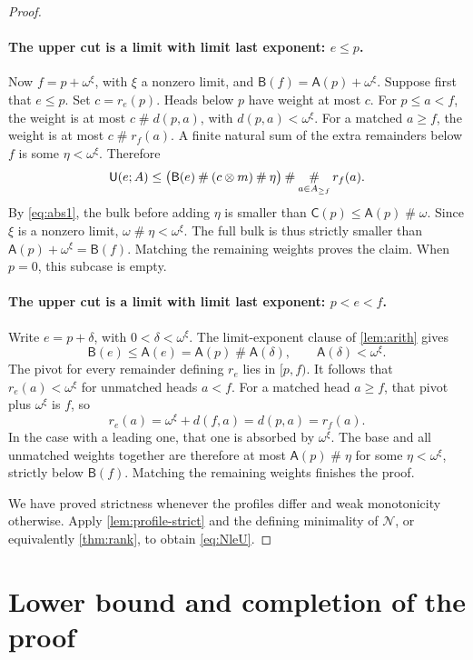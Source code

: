 \documentclass[11pt,a4paper]{article}
\theoremstyle{definition}
\newcommand{\ns}{\mathbin{\#}}
\newcommand{\nprod}{\mathbin{\otimes}}
\newcommand{\bigns}{\mathop{\#}\displaylimits}
\newcommand{\OpN}{\mathcal N}
\newcommand{\FunA}{\mathsf A}
\newcommand{\FunB}{\mathsf B}
\newcommand{\FunC}{\mathsf C}
\newcommand{\FunU}{\mathsf U}
\newcommand{\dd}[2]{d(#1,#2)}
\begin{document}
\begin{proof}
\paragraph{The upper cut is a limit with limit last exponent: $e\le p$.}
Now $f=p+\omega^\xi$, with $\xi$ a nonzero limit, and
$\FunB(f)=\FunA(p)+\omega^\xi$. Suppose first that $e\le p$.
Set $c=r_e(p)$. Heads below $p$ have weight at most $c$.
For $p\le a<f$, the weight is at most $c\ns\dd{p}{a}$, with
$\dd{p}{a}<\omega^\xi$. For a matched $a\ge f$, the weight is at most
$c\ns r_f(a)$. A finite natural sum of the extra remainders below $f$ is
some $\eta<\omega^\xi$. Therefore
\[
 \FunU(e;A)\le
 \bigl(\FunB(e)\ns(c\nprod m)\ns\eta\bigr)
      \ns\bigns_{a\in A_{\ge f}}r_f(a).
\]
By \eqref{eq:abs1}, the bulk before adding $\eta$ is smaller than
$\FunC(p)\le\FunA(p)\ns\omega$. Since $\xi$ is a nonzero limit,
$\omega\ns\eta<\omega^\xi$. The full bulk is thus strictly smaller than
$\FunA(p)+\omega^\xi=\FunB(f)$. Matching the remaining weights proves the
claim. When $p=0$, this subcase is empty.

\paragraph{The upper cut is a limit with limit last exponent: $p<e<f$.}
Write $e=p+\delta$, with $0<\delta<\omega^\xi$. The limit-exponent clause
of \cref{lem:arith} gives
\[
 \FunB(e)\le\FunA(e)=\FunA(p)\ns\FunA(\delta),
 \qquad\FunA(\delta)<\omega^\xi.
\]
The pivot for every remainder defining $r_e$ lies in $[p,f)$.
It follows that $r_e(a)<\omega^\xi$ for unmatched heads $a<f$.
For a matched head $a\ge f$, that pivot plus $\omega^\xi$ is $f$, so
\[
 r_e(a)=\omega^\xi+\dd{f}{a}=\dd{p}{a}=r_f(a).
\]
In the case with a leading one, that one is absorbed by $\omega^\xi$.
The base and all unmatched weights together are therefore at most
$\FunA(p)\ns\eta$ for some $\eta<\omega^\xi$, strictly below $\FunB(f)$.
Matching the remaining weights finishes the proof.

We have proved strictness whenever the profiles differ and weak monotonicity
otherwise. Apply \cref{lem:profile-strict} and the defining minimality of
$\OpN$, or equivalently \cref{thm:rank}, to obtain \eqref{eq:NleU}.
\end{proof}

\section{Lower bound and completion of the proof}\label{sec:lower}
\end{document}
